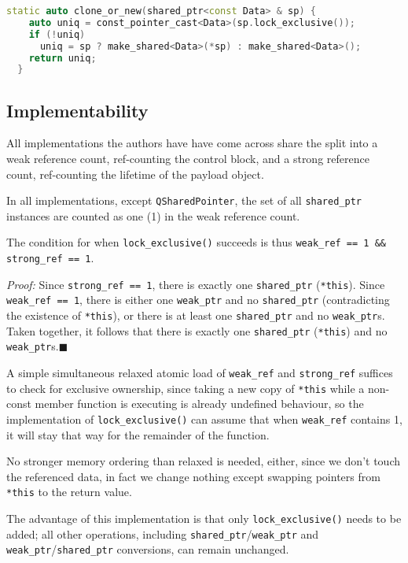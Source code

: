 \documentclass[11pt]{article}
\newcommand{\lockx}{\texttt{lock\_exclusive()}}
\newcommand{\wptr}{\texttt{weak\_ptr}}
\newcommand{\sptr}{\texttt{shared\_ptr}}
\begin{document}
\begin{lstlisting}[language=C++,caption={\texttt{clone\_or\_new()} using \lockx}]
  static auto clone_or_new(shared_ptr<const Data> & sp) {
    auto uniq = const_pointer_cast<Data>(sp.lock_exclusive());
    if (!uniq)
      uniq = sp ? make_shared<Data>(*sp) : make_shared<Data>();
    return uniq;
  }
\end{lstlisting}

\subsection{Implementability}

All implementations the authors have have come across share the split
into a weak reference count, ref-counting the control block, and a
strong reference count, ref-counting the lifetime of the payload
object.

In all implementations, except \texttt{QSharedPointer}, the set of all
\sptr{} instances are counted as one (1) in the weak reference count.

The condition for when \lockx{} succeeds is thus \texttt{weak\_ref == 1
  \&\& strong\_ref == 1}.

\textit{Proof:} Since \texttt{strong\_ref == 1}, there is exactly one
\sptr{} (\texttt{*this}). Since \texttt{weak\_ref == 1}, there is
either one \wptr{} and no \sptr{} (contradicting the existence of
\texttt{*this}), or there is at least one \sptr{} and no
\wptr{}s. Taken together, it follows that there is exactly one \sptr{}
(\texttt{*this}) and no \wptr{}s.\hfill$\blacksquare$

A simple simultaneous relaxed atomic load of \texttt{weak\_ref} and
\texttt{strong\_ref} suffices to check for exclusive ownership, since
taking a new copy of \texttt{*this} while a non-const member function
is executing is already undefined behaviour, so the implementation of
\lockx{} can assume that when \texttt{weak\_ref} contains 1, it will
stay that way for the remainder of the function.

No stronger memory ordering than relaxed is needed, either, since we
don't touch the referenced data, in fact we change nothing except
swapping pointers from \texttt{*this} to the return value.

The advantage of this implementation is that only \lockx{} needs to be
added; all other operations, including \sptr/\wptr{} and \wptr/\sptr{}
conversions, can remain unchanged.
\end{document}

